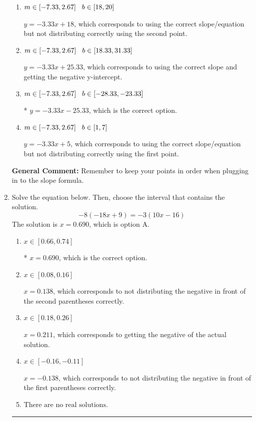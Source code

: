 \documentclass{extbook}[14pt]
\newcommand{\litem}[1]{\item #1

\rule{\textwidth}{0.4pt}}
\begin{document}
\begin{enumerate}
{\begin{enumerate}[label=\Alph*.]
 $y = 3.33x + 41.33$, which corresponds to using the negative slope and the correct equation.
\item \( m \in [-7.33, 2.67] \hspace*{3mm} b \in [18, 20] \)

 $y = -3.33x + 18$, which corresponds to using the correct slope/equation but not distributing correctly using the second point.
\item \( m \in [-7.33, 2.67] \hspace*{3mm} b \in [18.33, 31.33] \)

 $y = -3.33x + 25.33$, which corresponds to using the correct slope and getting the negative y-intercept.
\item \( m \in [-7.33, 2.67] \hspace*{3mm} b \in [-28.33, -23.33] \)

* $y = -3.33x -25.33$, which is the correct option.
\item \( m \in [-7.33, 2.67] \hspace*{3mm} b \in [1, 7] \)

 $y = -3.33x + 5$, which corresponds to using the correct slope/equation but not distributing correctly using the first point.
\end{enumerate}

\textbf{General Comment:} Remember to keep your points in order when plugging in to the slope formula.
}
\litem{
Solve the equation below. Then, choose the interval that contains the solution.
\[ -8(-18x + 9) = -3(10x -16) \]The solution is \( x = 0.690 \), which is option A.\begin{enumerate}[label=\Alph*.]
\item \( x \in [0.66, 0.74] \)

* $x = 0.690$, which is the correct option.
\item \( x \in [0.08, 0.16] \)

$x = 0.138$, which corresponds to not distributing the negative in front of the second parentheses correctly.
\item \( x \in [0.18, 0.26] \)

$x = 0.211$, which corresponds to getting the negative of the actual solution.
\item \( x \in [-0.16, -0.11] \)

$x = -0.138$, which corresponds to not distributing the negative in front of the first parentheses correctly.
\item \( \text{There are no real solutions.} \)


\end{enumerate}}
\end{enumerate}
\end{document}
